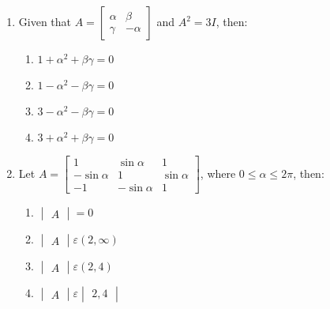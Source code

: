 \documentclass{article}
\newcommand{\myvec}[1]{\begin{bmatrix}#1\end{bmatrix}}
\newcommand{\mydet}[1]{\begin{vmatrix}#1\end{vmatrix}}
\begin{document}
\begin{enumerate}
    \item Given that $A = 
        \myvec{\alpha & \beta \\ \gamma & -\alpha}$ and $A^2 = 3I$, then:
    \begin{enumerate}
        \item $1 + \alpha^2 + \beta\gamma = 0$
        \item $1 - \alpha^2 - \beta\gamma = 0$
        \item $3 - \alpha^2 - \beta\gamma = 0$
        \item $3 + \alpha^2 + \beta\gamma = 0$
    \end{enumerate}
    \item Let $A = \myvec{1 & \sin\alpha & 1 \\ -\sin\alpha & 1 & \sin\alpha \\ -1 & -\sin\alpha & 1}$, where $0\leq \alpha \leq 2\pi$, then:
    \begin{enumerate}
	    \item $\mydet{A}=0$
	    \item $\mydet{A} \varepsilon (2,\infty)$
	    \item $\mydet{A} \varepsilon (2,4)$
	    \item $\mydet{A} \varepsilon \mydet{2,4}$
    \end{enumerate}
\end{enumerate}
\end{document}
